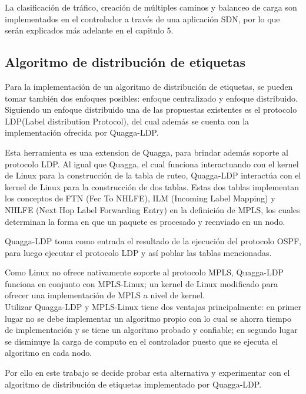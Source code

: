 La clasificaci\'on de tr\'afico, creación de m\'ultiples caminos y balanceo de carga son implementados en el controlador a través de una aplicaci\'on SDN, por lo que ser\'an explicados m\'as adelante en el capitulo 5.

\subsection{Algoritmo de distribución de etiquetas}

Para la implementaci\'on de un algoritmo de distribución de etiquetas, se pueden tomar también dos enfoques posibles: enfoque centralizado y enfoque distribuido.\\

Siguiendo un enfoque distribuido una de las propuestas existentes es el protocolo LDP(Label distribution Protocol), del cual adem\'as se cuenta con la implementaci\'on ofrecida por Quagga-LDP. 

Esta herramienta es una extension de Quagga, para brindar adem\'as soporte al protocolo LDP. Al igual que Quagga, el cual funciona interactuando con el kernel de Linux para la construcci\'on de la tabla de ruteo, Quagga-LDP interact\'ua con el kernel de Linux para la construcci\'on de dos tablas. Estas dos tablas implementan los conceptos de FTN (Fec To NHLFE), ILM (Incoming Label Mapping) y NHLFE (Next Hop Label Forwarding Entry) en la definición de MPLS, los cuales determinan la forma en que un paquete es procesado y reenviado en un nodo.

Quagga-LDP toma como entrada el resultado de la ejecuci\'on del protocolo OSPF, para luego ejecutar el protocolo LDP y así poblar las tablas mencionadas.

Como Linux no ofrece nativamente soporte al protocolo MPLS, Quagga-LDP funciona en conjunto con MPLS-Linux; un kernel de Linux modificado para ofrecer una implementaci\'on de MPLS a nivel de kernel.\\

Utilizar Quagga-LDP y MPLS-Linux tiene dos ventajas principalmente: en primer lugar no se debe implementar un algoritmo propio con lo cual se ahorra tiempo de implementaci\'on y se tiene un algoritmo probado y confiable; en segundo lugar se disminuye la carga de computo en el controlador puesto que se ejecuta el algoritmo en cada nodo.

Por ello en este trabajo se decide probar esta alternativa y experimentar con el algoritmo de distribución de etiquetas implementado por Quagga-LDP.\\

